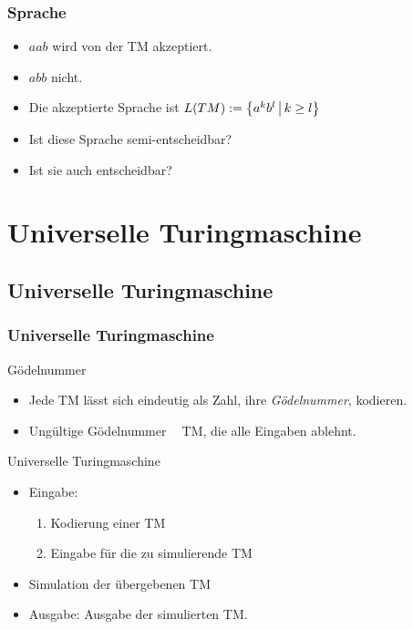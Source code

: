 \begin{frame}
 \frametitle{Sprache}
 \begin{itemize}
  \item $aab$ wird von der TM akzeptiert.
  \item $abb$ nicht.
  \item Die akzeptierte Sprache ist $L(TM) := \left\lbrace a^kb^l \,\middle\vert\, k \geq l \right\rbrace$
 

 \hfill 
 \resizebox{8cm}{!} {%
  \thetm
 }
  \invincible
  \pause
 \ducttape{-6cm} 
  \item Ist diese Sprache semi-entscheidbar?
  \pause
  \item Ist sie auch entscheidbar?
  \vincible
 \end{itemize}
 
\end{frame}



\section{Universelle Turingmaschine}
\subsection{Universelle Turingmaschine}
\begin{frame}
\frametitle{Universelle Turingmaschine}
\begin{block}{Gödelnummer}
\begin{itemize}
\item Jede TM lässt sich eindeutig als Zahl, ihre \emph{Gödelnummer}, kodieren.
\item Ungültige Gödelnummer $\mathop{\hat{=}}$ TM, die alle Eingaben ablehnt.
\end{itemize}
\end{block}
\begin{block}{Universelle Turingmaschine}
\begin{itemize}

\item Eingabe:
\begin{enumerate}
\item Kodierung einer TM
\item Eingabe für die zu simulierende TM
\end{enumerate}
\item Simulation der übergebenen TM
\item Ausgabe: Ausgabe der simulierten TM.
\end{itemize}
\end{block}
\end{frame}


